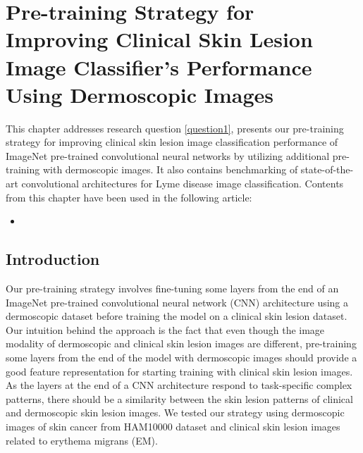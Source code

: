 \chapter{Pre-training Strategy for Improving Clinical Skin Lesion Image Classifier's Performance Using Dermoscopic Images}\label{chap:Pretraining}

\begin{center}
	\begin{minipage}{0.8\textwidth}
		\begin{small}
			This chapter addresses research question \ref{question1}, presents our pre-training strategy for improving clinical skin lesion image classification performance of ImageNet pre-trained convolutional neural networks by utilizing additional pre-training with dermoscopic images. It also contains benchmarking of state-of-the-art convolutional architectures for Lyme disease image classification. Contents from this chapter have been used in the following article:
			\begin{itemize}
				\item {}
			\end{itemize}  
		\end{small}
	\end{minipage}
	\vspace{0.5cm}
\end{center}

\minitoc

\section{Introduction}
Our pre-training strategy involves fine-tuning some layers from the end of an ImageNet pre-trained convolutional neural network (CNN) architecture using a dermoscopic dataset before training the model on a clinical skin lesion dataset. Our intuition behind the approach is the fact that even though the image modality of dermoscopic and clinical skin lesion images are different, pre-training some layers from the end of the model with dermoscopic images should provide a good feature representation for starting training with clinical skin lesion images. As the layers at the end of a CNN architecture respond to task-specific complex patterns, there should be a similarity between the skin lesion patterns of clinical and dermoscopic skin lesion images. We tested our strategy using dermoscopic images of skin cancer from HAM10000 dataset \cite{Tschandl2018} and clinical skin lesion images related to erythema migrans (EM).


